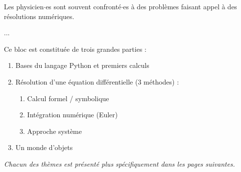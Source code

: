 Les physicien$\cdot$es sont souvent confronté$\cdot$es à des problèmes faisant appel à des résolutions numériques. 

...

\medskip

Ce bloc est constituée de trois grandes parties :

\begin{enumerate}
	\item Bases du langage Python et premiers calculs
	\item Résolution d'une équation différentielle (3 méthodes) :
	\begin{enumerate}
		\item Calcul formel / symbolique
		\item Intégration numérique (Euler)
		\item Approche système
	\end{enumerate}
	\item Un monde d'objets
\end{enumerate}

\textit{Chacun des thèmes est présenté plus spécifiquement dans les pages suivantes.}
